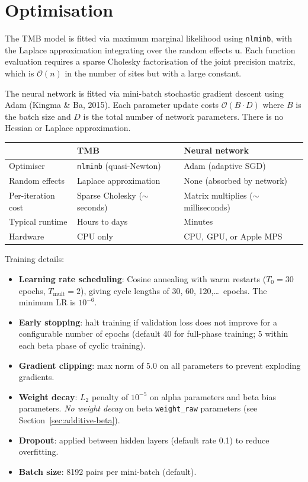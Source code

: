 \documentclass{article}
\begin{document}
\section{Optimisation}

The TMB model is fitted via maximum marginal likelihood using \texttt{nlminb}, with the Laplace approximation integrating over the random effects $\mathbf{u}$. Each function evaluation requires a sparse Cholesky factorisation of the joint precision matrix, which is $\mathcal{O}(n)$ in the number of sites but with a large constant.

The neural network is fitted via mini-batch stochastic gradient descent using Adam (Kingma \& Ba, 2015). Each parameter update costs $\mathcal{O}(B \cdot D)$ where $B$ is the batch size and $D$ is the total number of network parameters. There is no Hessian or Laplace approximation.

\begin{center}
\begin{tabular}{l|l|l}
    & TMB & Neural network \\
    \hline
    Optimiser & \texttt{nlminb} (quasi-Newton) & Adam (adaptive SGD) \\
    Random effects & Laplace approximation & None (absorbed by network) \\
    Per-iteration cost & Sparse Cholesky ($\sim$ seconds) & Matrix multiplies ($\sim$ milliseconds) \\
    Typical runtime & Hours to days & Minutes \\
    Hardware & CPU only & CPU, GPU, or Apple MPS \\
\end{tabular}
\end{center}

Training details:
\begin{itemize}
    \item \textbf{Learning rate scheduling}: Cosine annealing with warm restarts ($T_0 = 30$ epochs, $T_{\text{mult}} = 2$), giving cycle lengths of 30, 60, 120,\ldots\ epochs. The minimum LR is $10^{-6}$.
    \item \textbf{Early stopping}: halt training if validation loss does not improve for a configurable number of epochs (default 40 for full-phase training; 5 within each beta phase of cyclic training).
    \item \textbf{Gradient clipping}: max norm of 5.0 on all parameters to prevent exploding gradients.
    \item \textbf{Weight decay}: $L_2$ penalty of $10^{-5}$ on alpha parameters and beta bias parameters. \textit{No weight decay} on beta \texttt{weight\_raw} parameters (see Section~\ref{sec:additive-beta}).
    \item \textbf{Dropout}: applied between hidden layers (default rate 0.1) to reduce overfitting.
    \item \textbf{Batch size}: 8192 pairs per mini-batch (default).
\end{itemize}
\end{document}
